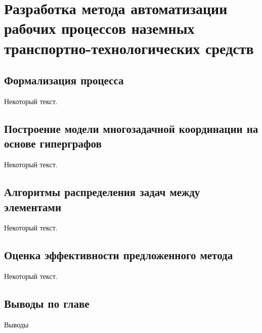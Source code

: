 \chapter{Разработка метода автоматизации рабочих процессов наземных транспортно-технологических средств}\label{ch:ch2}

\section{Формализация процесса}\label{sec:ch2/sec1}

Некоторый текст.

\section{Построение модели многозадачной координации на основе гиперграфов}\label{sec:ch2/sec2}

Некоторый текст.

\section{Алгоритмы распределения задач между элементами}\label{sec:ch2/sec3}

Некоторый текст.

\section{Оценка эффективности предложенного метода}\label{sec:ch2/sec4}

Некоторый текст.

\section*{Выводы по главе}\label{sec:ch2/sec5}

Выводы

\FloatBarrier
